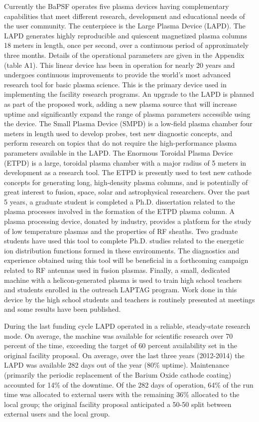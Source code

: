 \documentclass[11pt]{article}
\begin{document}
Currently the BaPSF operates five plasma devices having complementary
capabilities that meet different research, development and educational
needs of the user community. The centerpiece is the Large Plasma Device
(LAPD). The LAPD generates highly reproducible and quiescent magnetized
plasma columns 18 meters in length, once per second, over a continuous
period of approximately three months. Details of the operational parameters are given in the Appendix
(table A1). This linear device has been in operation for nearly 20 years
and undergoes continuous improvements to provide the world's
most advanced research tool for basic plasma science. This is the
primary device used in implementing
the facility research programs. An upgrade to the LAPD is planned as
part of the proposed work, adding a new plasma source that will increase
uptime and significantly expand the range of plasma parameters
accessible using the device. The Small Plasma Device (SMPD) is a
low-field plasma chamber four meters in length used to develop probes,
test new diagnostic concepts, and perform research on topics that do not
require the high-performance plasma parameters available in the LAPD.
The Enormous Toroidal Plasma Device (ETPD) is a large, toroidal plasma
chamber with a major radius of 5 meters in development as a research
tool. The ETPD is presently used to test new cathode concepts for
generating long, high-density plasma columns, and is potentially of
great interest to fusion, space, solar and astrophysical researchers.
Over the past 5 years, a graduate student is completed a Ph.D.
dissertation related to the plasma processes involved in the formation
of the ETPD plasma column. A plasma processing device, donated by
industry, provides a platform for the study of low temperature plasmas
and the properties of RF sheaths. Two graduate students have used this
tool to complete Ph.D. studies related to the energetic ion distribution
functions formed in these environments. The diagnostics and experience
obtained using this tool will be beneficial in a forthcoming campaign
related to RF antennas used in fusion plasmas. Finally, a small,
dedicated machine with a helicon-generated plasma is used to train high
school teachers and students enrolled in the outreach LAPTAG program.
Work done in this device by the high school students and teachers is
routinely presented at meetings and some results have been published.

During the last funding cycle LAPD operated in a reliable, steady-state
research mode. On average, the machine was available for scientific
research over 70 percent of the time, exceeding the target of 60 percent
availability set in the original facility proposal. On average, over the
last three years (2012-2014) the LAPD was available 282 days out of the
year (80\% uptime). Maintenance (primarily the periodic replacement of
the Barium Oxide cathode coating) accounted for 14\% of the downtime. Of
the 282 days of operation, 64\% of the run time was allocated to
external users with the remaining 36\% allocated to the local group; the
original facility proposal anticipated a 50-50 split between external
users and the local group.
\end{document}
